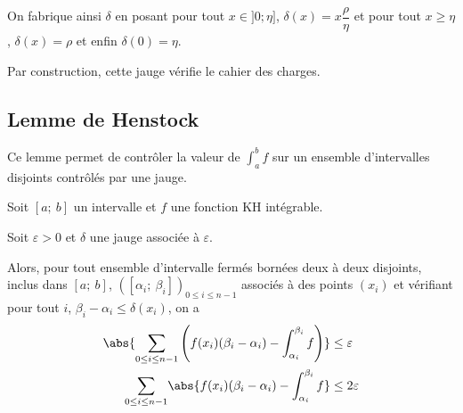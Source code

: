 On fabrique ainsi $\delta$ en posant pour tout $x \in ]0;\eta]$, $\delta(x) = x \dfrac{\rho}{\eta}$ et pour tout $x \geq \eta$, $\delta(x) = \rho$ et enfin $\delta(0) = \eta$.

Par construction, cette jauge vérifie le cahier des charges.

\subsection{Lemme de Henstock}

Ce lemme permet de contrôler la valeur de $\int_a^b f$ sur un ensemble d'intervalles disjoints contrôlés par une jauge.

\begin{lem}[Henstock]
Soit $[a;~b]$ un intervalle et $f$ une fonction KH intégrable. 

Soit $\varepsilon>0$ et $\delta$ une jauge associée à $\varepsilon$.


Alors, pour tout ensemble d'intervalle fermés bornées deux à deux disjoints, inclus dans $[a;~b]$, $([\alpha_i;~\beta_i])_{0 \leq i \leq n-1}$ associés à des points $(x_i)$ et vérifiant pour tout $i$, $\beta_i-\alpha_i \leq \delta(x_i)$, on a
\begin{align*}
\abs{\displaystyle{\sum \limits_{0 \leq i \leq n-1}} \left (f(x_i) (\beta_i-\alpha_i) - \int_{\alpha_i}^{\beta_i} f \right )} & \leq \varepsilon  \\
\displaystyle{\sum \limits_{0 \leq i \leq n-1}} \abs{f(x_i) (\beta_i-\alpha_i) - \int_{\alpha_i}^{\beta_i} f } & \leq 2\varepsilon 
\end{align*}
\end{lem}

